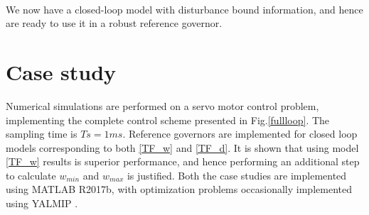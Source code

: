 \documentclass[letterpaper, 10 pt, conference]{ieeeconf}  %
\begin{document}
	 \\
	We now have a closed-loop model with disturbance bound information, and hence are ready to use it in a robust reference governor.
	\section{Case study}
	Numerical simulations are performed on a servo motor control problem, implementing the complete control scheme presented in Fig.\ref{fullloop}. The sampling time is $Ts = 1 ms$. Reference governors are implemented for closed loop models corresponding to both \eqref{TF_w} and \eqref{TF_d}. It is shown that using model \eqref{TF_w} results is superior performance, and hence performing an additional step to calculate $w_{min}$ and $w_{max}$ is justified.
	Both the case studies are implemented using MATLAB R2017b, with optimization problems occasionally implemented using YALMIP \cite{Lofberg2004}.
	\label{Case studies}
	\iffalse
\end{document}
